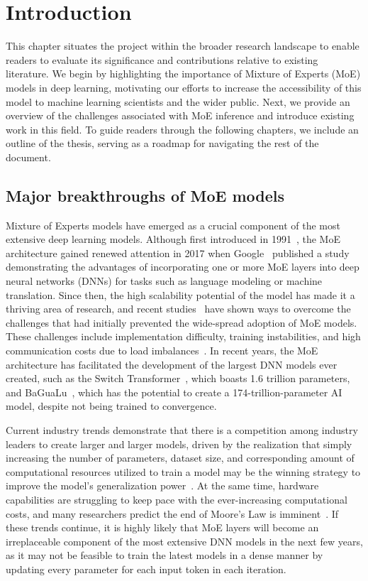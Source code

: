 
\chapter{Introduction}
This chapter situates the project within the broader research landscape to enable readers to evaluate its significance and contributions relative to existing literature. We begin by highlighting the importance of Mixture of Experts (MoE) models in deep learning, motivating our efforts to increase the accessibility of this model to machine learning scientists and the wider public. Next, we provide an overview of the challenges associated with MoE inference and introduce existing work in this field. To guide readers through the following chapters, we include an outline of the thesis, serving as a roadmap for navigating the rest of the document.

\section{Major breakthroughs of MoE models}\label{intro1}
Mixture of Experts models have emerged as a crucial component of the most extensive deep learning models. Although first introduced in 1991~\cite{original_moe}, the MoE architecture gained renewed attention in 2017 when Google~\cite{shazeer2017} published a study demonstrating the advantages of incorporating one or more MoE layers into deep neural networks (DNNs) for tasks such as language modeling or machine translation. Since then, the high scalability potential of the model has made it a thriving area of research, and recent studies~\cite{g-shard,tutel,fastermoe,switch_transformer} have shown ways to overcome the challenges that had initially prevented the wide-spread adoption of MoE models. These challenges include implementation difficulty, training instabilities, and high communication costs due to load imbalances~\cite{switch_transformer}. In recent years, the MoE architecture has facilitated the development of the largest DNN models ever created, such as the Switch Transformer~\cite{switch_transformer}, which boasts 1.6 trillion parameters, and BaGuaLu~\cite{BaGuaLu}, which has the potential to create a 174-trillion-parameter AI model, despite not being trained to convergence.

Current industry trends demonstrate that there is a competition among industry leaders to create larger and larger models, driven by the realization that simply increasing the number of parameters, dataset size, and corresponding amount of computational resources utilized to train a model may be the winning strategy to improve the model's generalization power~\cite{sutton_2019}. At the same time, hardware capabilities are struggling to keep pace with the ever-increasing computational costs, and many researchers predict the end of Moore's Law is imminent~\cite{rotman_2021}. If these trends continue, it is highly likely that MoE layers will become an irreplaceable component of the most extensive DNN models in the next few years, as it may not be feasible to train the latest models in a dense manner by updating every parameter for each input token in each iteration.


